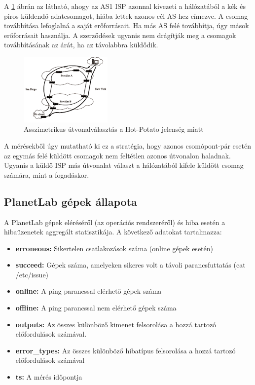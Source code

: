\pagebreak

A \ref{fig:hot-potato} ábrán az látható, ahogy az AS1 ISP azonnal kivezeti a hálózatából a kék és piros küldendő adatcsomagot, hiába lettek azonos cél AS-hez címezve. A csomag továbbítása lefoglalná a saját erőforrásait. Ha más AS felé továbbítja, úgy mások erőforrásait használja. A szerződések ugyanis nem drágítják meg a csomagok továbbításának az árát, ha az távolabbra küldődik.

\begin{figure}[!ht]
	\centering
	\includegraphics[width=0.4\textwidth, keepaspectratio]{figures/asymetric.PNG}
	\caption{Asszimetrikus útvonalválasztás a Hot-Potato jelenség miatt\protect\footnotemark}
	\label{fig:hot-potato}
\end{figure}


A mérésekből úgy mutatható ki ez a stratégia, hogy azonos csomópont-pár esetén az egymás felé küldött csomagok nem feltétlen azonos útvonalon haladnak. Ugyanis a küldő ISP más útvonalat választ a hálózatából kifele küldött csomag számára, mint a fogadáskor.

\subsection*{PlanetLab gépek állapota}
A PlanetLab gépek eléréséről (az operációs rendszeréről) és hiba esetén a hibaüzenetek aggregált statisztikája. A következő adatokat tartalmazza:

\begin{itemize}
\item \textbf{erroneous:} Sikertelen csatlakozások száma (online gépek esetén)
\item \textbf{succeed:} Gépek száma, amelyeken sikeres volt a távoli parancsfuttatás (cat /etc/issue)
\item \textbf{online:} A ping parancssal elérhető gépek száma
\item \textbf{offline:} A ping parancssal nem elérhető gépek száma
\item \textbf{outputs:} Az összes különböző kimenet felsorolása a hozzá tartozó előfordulások számával.
\item \textbf{error\_types:} Az összes különböző hibatípus felsorolása a hozzá tartozó előfordulások számával
\item \textbf{ts:} A mérés időpontja
\end{itemize}

